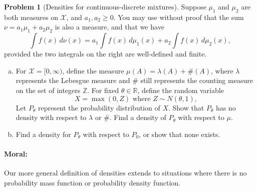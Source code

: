 \documentclass{article}
\newcommand{\cX}{\mathcal{X}}
\newcommand{\RR}{\mathbb{R}}
\newcommand{\ZZ}{\mathbb{Z}}
\theoremstyle{definition}
\newtheorem{problem}{Problem}
\begin{document}
\begin{problem}[Densities for continuous-discrete mixtures]
\label{prob:densities}
Suppose $\mu_1$ and $\mu_2$ are both measures on $\cX$, and $a_1,a_2 \geq 0$. You may use without proof that the sum $\nu = a_1\mu_1 + a_2\mu_2$ is also a measure, and that we have
\[
\int f(x)\,d \nu(x) = a_1\int f(x)\,d \mu_1(x) + a_2\int f(x)\,d \mu_2(x),
\]
provided the two integrals on the right are well-defined and finite.

\begin{enumerate}[(a)]
\item For $\cX = [0,\infty)$, define the measure $\mu(A) = \lambda(A) + \#(A)$, where $\lambda$ represents the Lebesgue measure and $\#$ still represents the counting measure on the set of integers $\ZZ$. For fixed $\theta \in \RR$, define the random variable 
\[
X = \max(0,Z) \text{ where } Z \sim N(\theta, 1),
\]
Let $P_\theta$ represent the probability distribution of $X$. Show that $P_\theta$ has no density with respect to $\lambda$ or $\#$. Find a density of $P_\theta$ with respect to $\mu$.

\item Find a density for $P_\theta$ with respect to $P_0$, or show that none exists.

\end{enumerate}

\paragraph{Moral:} Our more general definition of densities extends to situations where there is no probability mass function or probability density function.
\end{problem}
\end{document}
